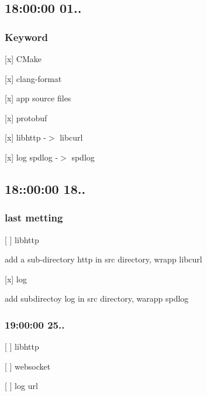 \subsection*{18\+:00\+:00 01..}

\subsubsection*{Keyword}


\begin{DoxyItemize}
\item \mbox{[}x\mbox{]} C\+Make
\item \mbox{[}x\mbox{]} clang-\/format
\item \mbox{[}x\mbox{]} app source files
\item \mbox{[}x\mbox{]} protobuf
\item \mbox{[}x\mbox{]} libhttp -\/$>$ libcurl
\item \mbox{[}x\mbox{]} log spdlog -\/$>$ spdlog
\end{DoxyItemize}

\subsection*{18\+:\+:00\+:00 18..}

\subsubsection*{last metting}


\begin{DoxyItemize}
\item \mbox{[} \mbox{]} libhttp

add a sub-\/directory {\ttfamily http} in {\ttfamily src} directory, wrapp {\ttfamily libcurl}
\item \mbox{[}x\mbox{]} log

add subdirectoy \textquotesingle{}log\textquotesingle{} in {\ttfamily src} directory, warapp {\ttfamily spdlog}
\end{DoxyItemize}

\subsubsection*{19\+:00\+:00 25..}


\begin{DoxyItemize}
\item \mbox{[} \mbox{]} libhttp
\item \mbox{[} \mbox{]} websocket
\item \mbox{[} \mbox{]} log url 
\end{DoxyItemize}